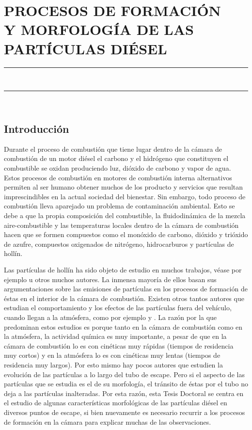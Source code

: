 \pagestyle{plain}
\chapter{PROCESOS DE FORMACIÓN \\ Y MORFOLOGÍA DE LAS PARTÍCULAS DIÉSEL} \label{cap:ProcesosFormacionyMorfologia}
\vspace{0.2cm}
\rule{\linewidth}{1.5pt}\\
\startcontents[chapters]
\vspace{0.2cm}
\rule{\linewidth}{1.5pt}\\
\newpage
\section{Introducción} \label{sec:Introduccion}

\par Durante el proceso de combustión que tiene lugar dentro de la cámara de combustión de un motor diésel el carbono y el hidrógeno que constituyen el combustible se oxidan produciendo luz, dióxido de carbono y vapor de agua. Estos procesos de combustión en motores de combustión interna alternativos permiten al ser humano obtener muchos de los producto y servicios que resultan imprescindibles en la actual sociedad del bienestar. Sin embargo, todo proceso de combustión lleva aparejado un problema de contaminación ambiental. Esto se debe a que la propia composición del combustible, la fluidodinámica de la mezcla aire-combustible y las temperaturas locales dentro de la cámara de combustión hacen que se formen compuestos como el monóxido de carbono, dióxido y trióxido de azufre, compuestos oxigenados de nitrógeno, hidrocarburos y partículas de  hollín. 
\par Las partículas de hollín ha sido objeto de estudio en muchos trabajos, véase por ejemplo \cite{chariphD:2002} u otros muchos autores. La inmensa mayoría de ellos basan sus argumentaciones sobre las emisiones de partículas en los procesos de formación de éstas en el interior de la cámara de combustión. Existen otros tantos autores que estudian el comportamiento y los efectos de las partículas fuera del vehículo, cuando llegan a la atmósfera, como por ejemplo \cite{kimetal:2001} y \cite{siegmannetal:1999}. La razón por la que predominan estos estudios es porque tanto en la cámara de combustión como en la atmósfera, la actividad química es muy importante, a pesar de que en la cámara de combustión lo es con cinéticas muy rápidas (tiempos de residencia muy cortos) y en la atmósfera lo es con cinéticas muy lentas (tiempos de residencia muy largos). Por esto mismo hay pocos autores que estudien la evolución de las partículas a lo largo del tubo de escape. Pero si el aspecto de las partículas que se estudia es el de su morfología, el tránsito de éstas por el tubo no deja a las partículas inalteradas. Por esta razón, esta Tesis Doctoral se centra en el estudio de algunas características morfológicas de las partículas diésel en diversos puntos de escape, si bien nuevamente es necesario recurrir a los procesos de formación en la cámara para explicar muchas de las observaciones.

